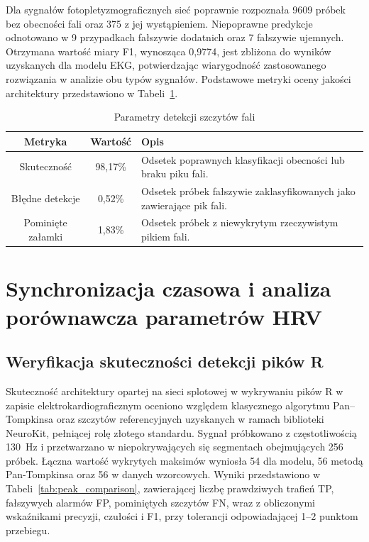 \documentclass[journal]{IEEEtran}
\begin{document}
Dla sygnałów fotopletyzmograficznych sieć poprawnie rozpoznała 9609 próbek bez obecności fali oraz 375 z jej wystąpieniem. Niepoprawne predykcje odnotowano w 9 przypadkach fałszywie dodatnich oraz 7  fałszywie ujemnych. Otrzymana wartość miary F1, wynosząca 0,9774, jest zbliżona do wyników uzyskanych dla modelu EKG, potwierdzając wiarygodność zastosowanego rozwiązania w analizie obu typów sygnałów.
Podstawowe metryki oceny jakości architektury przedstawiono w Tabeli~\ref{tab:metrics_ppg}.

\begin{table}[ht]
\centering
\caption{Parametry detekcji szczytów fali}
\label{tab:metrics_ppg}
\begin{tabular}{|c|c|p{4.6cm}|}
\hline
\textbf{Metryka} & \textbf{Wartość} & \textbf{Opis} \\
\hline
Skuteczność & 98,17\% & Odsetek poprawnych klasyfikacji obecności lub braku piku fali. \\
Błędne detekcje & 0,52\% & Odsetek próbek fałszywie zaklasyfikowanych jako zawierające pik fali. \\
Pominięte załamki & 1,83\% & Odsetek próbek z niewykrytym rzeczywistym pikiem fali. \\
\hline
\end{tabular}
\end{table}

\section{Synchronizacja czasowa i analiza porównawcza parametrów HRV}
\subsection{Weryfikacja skuteczności detekcji pików R}
Skuteczność architektury opartej na sieci splotowej w wykrywaniu pików R w zapisie elektrokardiograficznym oceniono względem klasycznego algorytmu Pan–Tompkinsa oraz szczytów referencyjnych uzyskanych w ramach biblioteki NeuroKit, pełniącej rolę złotego standardu. Sygnał próbkowano z częstotliwością 130 Hz i przetwarzano w niepokrywających się segmentach obejmujących 256 próbek. Łączna wartość wykrytych maksimów wyniosła 54 dla modelu, 56 metodą Pan-Tompkinsa oraz 56 w danych wzorcowych. Wyniki przedstawiono w Tabeli~\ref{tab:peak_comparison}, zawierającej liczbę prawdziwych trafień TP, fałszywych alarmów FP, pominiętych szczytów FN, wraz z obliczonymi wskaźnikami precyzji, czułości i F1, przy tolerancji odpowiadającej 1–2 punktom przebiegu.
\end{document}
